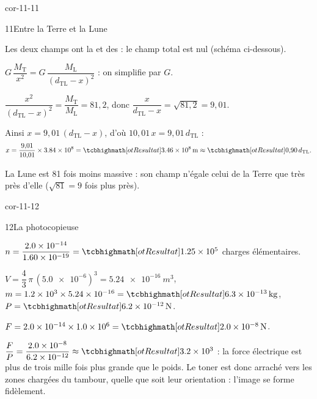 \begin{blocLivre}{cor-11-11}
\begin{corrige}{11}{Entre la Terre et la Lune}
\begin{questions}
\item Les deux champs ont la  et des  : le champ total est nul (schéma ci-dessous).
\item $G\,\dfrac{M_\mathrm{T}}{x^2}=G\,\dfrac{M_\mathrm{L}}{(d_\mathrm{TL}-x)^2}$ : on simplifie par $G$.
\item $\dfrac{x^2}{(d_\mathrm{TL}-x)^2}=\dfrac{M_\mathrm{T}}{M_\mathrm{L}}=81{,}2$, donc $\dfrac{x}{d_\mathrm{TL}-x}=\sqrt{81{,}2}=9{,}01$.\par\smallskip
Ainsi $x=9{,}01\,(d_\mathrm{TL}-x)$, d'où $10{,}01\,x=9{,}01\,d_\mathrm{TL}$ :
\[x=\frac{9{,}01}{10{,}01}\times\num{3,84e8}=\res{\qty{3,46e8}{m}}\approx\res{0{,}90\,d_\mathrm{TL}}.\]
\item La Lune est 81 fois moins massive : son champ n'égale celui de la Terre que très près d'elle ($\sqrt{81}=9$ fois plus près).
\end{questions}
\end{corrige}
\end{blocLivre}
\begin{blocLivre}{cor-11-12}
\begin{corrige}{12}{La photocopieuse}
\begin{questions}
\item $n=\dfrac{\num{2,0e-14}}{\num{1,60e-19}}=\res{\num{1,25e5}}$ charges élémentaires.
\item $V=\dfrac{4}{3}\,\pi\,(\num{5,0e-6})^3=\qty{5,24e-16}{m^3}$, $m=\num{1,2e3}\times\num{5,24e-16}=\res{\qty{6,3e-13}{kg}}$, $P=\res{\qty{6,2e-12}{N}}$.
\item $F=\num{2,0e-14}\times\num{1,0e6}=\res{\qty{2,0e-8}{N}}$.
\item $\dfrac{F}{P}=\dfrac{\num{2,0e-8}}{\num{6,2e-12}}\approx\res{\num{3,2e3}}$ : la force électrique est plus de trois mille fois plus grande que le poids. Le
toner est donc arraché vers les zones chargées du tambour, quelle que soit leur orientation : l'image se forme fidèlement.
\end{questions}
\end{corrige}
\end{blocLivre}
